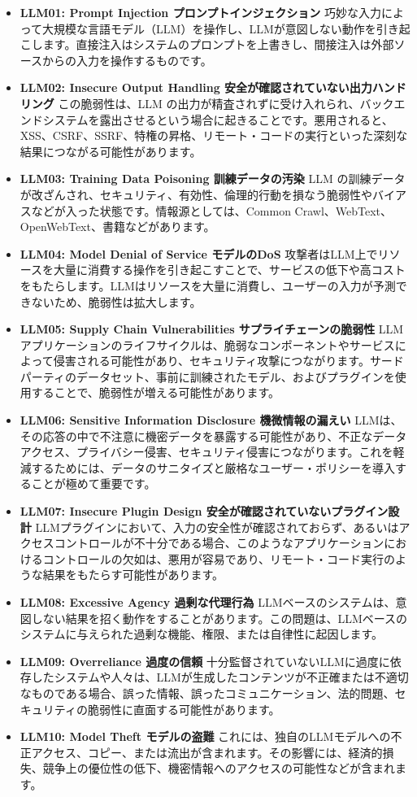 \documentclass[
]{article}
\providecommand{\tightlist}{%
  \setlength{\itemsep}{0pt}\setlength{\parskip}{0pt}}
\begin{document}
\begin{itemize}
\tightlist
\item
  \textbf{LLM01: Prompt Injection プロンプトインジェクション}
  巧妙な入力によって大規模な言語モデル（LLM）を操作し、LLMが意図しない動作を引き起こします。直接注入はシステムのプロンプトを上書きし、間接注入は外部ソースからの入力を操作するものです。
\item
  \textbf{LLM02: Insecure Output Handling
  安全が確認されていない出力ハンドリング} この脆弱性は、LLM
  の出力が精査されずに受け入れられ、バックエンドシステムを露出させるという場合に起きることです。悪用されると、XSS、CSRF、SSRF、特権の昇格、リモート・コードの実行といった深刻な結果につながる可能性があります。
\item
  \textbf{LLM03: Training Data Poisoning 訓練データの汚染} LLM
  の訓練データが改ざんされ、セキュリティ、有効性、倫理的行動を損なう脆弱性やバイアスなどが入った状態です。情報源としては、Common
  Crawl、WebText、OpenWebText、書籍などがあります。
\item
  \textbf{LLM04: Model Denial of Service モデルのDoS}
  攻撃者はLLM上でリソースを大量に消費する操作を引き起こすことで、サービスの低下や高コストをもたらします。LLMはリソースを大量に消費し、ユーザーの入力が予測できないため、脆弱性は拡大します。
\item
  \textbf{LLM05: Supply Chain Vulnerabilities サプライチェーンの脆弱性}
  LLMアプリケーションのライフサイクルは、脆弱なコンポーネントやサービスによって侵害される可能性があり、セキュリティ攻撃につながります。サードパーティのデータセット、事前に訓練されたモデル、およびプラグインを使用することで、脆弱性が増える可能性があります。
\item
  \textbf{LLM06: Sensitive Information Disclosure 機微情報の漏えい}
  LLMは、その応答の中で不注意に機密データを暴露する可能性があり、不正なデータアクセス、プライバシー侵害、セキュリティ侵害につながります。これを軽減するためには、データのサニタイズと厳格なユーザー・ポリシーを導入することが極めて重要です。
\item
  \textbf{LLM07: Insecure Plugin Design
  安全が確認されていないプラグイン設計}
  LLMプラグインにおいて、入力の安全性が確認されておらず、あるいはアクセスコントロールが不十分である場合、このようなアプリケーションにおけるコントロールの欠如は、悪用が容易であり、リモート・コード実行のような結果をもたらす可能性があります。
\item
  \textbf{LLM08: Excessive Agency 過剰な代理行為}
  LLMベースのシステムは、意図しない結果を招く動作をすることがあります。この問題は、LLMベースのシステムに与えられた過剰な機能、権限、または自律性に起因します。
\item
  \textbf{LLM09: Overreliance 過度の信頼}
  十分監督されていないLLMに過度に依存したシステムや人々は、LLMが生成したコンテンツが不正確または不適切なものである場合、誤った情報、誤ったコミュニケーション、法的問題、セキュリティの脆弱性に直面する可能性があります。
\item
  \textbf{LLM10: Model Theft モデルの盗難}
  これには、独自のLLMモデルへの不正アクセス、コピー、または流出が含まれます。その影響には、経済的損失、競争上の優位性の低下、機密情報へのアクセスの可能性などが含まれます。
\end{itemize}
\end{document}
